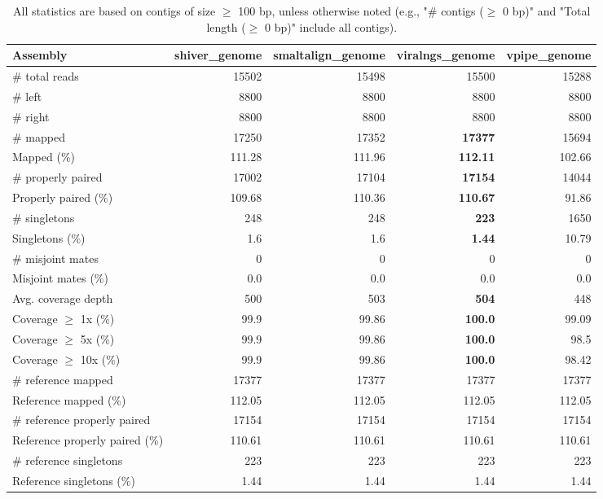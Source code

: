 \documentclass[12pt,a4paper]{article}
\begin{document}
\begin{table}[ht]
\begin{center}
\caption{All statistics are based on contigs of size $\geq$ 100 bp, unless otherwise noted (e.g., "\# contigs ($\geq$ 0 bp)" and "Total length ($\geq$ 0 bp)" include all contigs).}
\begin{tabular}{|l*{4}{|r}|}
\hline
Assembly & shiver\_genome & smaltalign\_genome & viralngs\_genome & vpipe\_genome \\ \hline
\# total reads & 15502 & 15498 & 15500 & 15288 \\ \hline
\# left & 8800 & 8800 & 8800 & 8800 \\ \hline
\# right & 8800 & 8800 & 8800 & 8800 \\ \hline
\# mapped & 17250 & 17352 & {\bf 17377} & 15694 \\ \hline
Mapped (\%) & 111.28 & 111.96 & {\bf 112.11} & 102.66 \\ \hline
\# properly paired & 17002 & 17104 & {\bf 17154} & 14044 \\ \hline
Properly paired (\%) & 109.68 & 110.36 & {\bf 110.67} & 91.86 \\ \hline
\# singletons & 248 & 248 & {\bf 223} & 1650 \\ \hline
Singletons (\%) & 1.6 & 1.6 & {\bf 1.44} & 10.79 \\ \hline
\# misjoint mates & 0 & 0 & 0 & 0 \\ \hline
Misjoint mates (\%) & 0.0 & 0.0 & 0.0 & 0.0 \\ \hline
Avg. coverage depth & 500 & 503 & {\bf 504} & 448 \\ \hline
Coverage $\geq$ 1x (\%) & 99.9 & 99.86 & {\bf 100.0} & 99.09 \\ \hline
Coverage $\geq$ 5x (\%) & 99.9 & 99.86 & {\bf 100.0} & 98.5 \\ \hline
Coverage $\geq$ 10x (\%) & 99.9 & 99.86 & {\bf 100.0} & 98.42 \\ \hline
\# reference mapped & 17377 & 17377 & 17377 & 17377 \\ \hline
Reference mapped (\%) & 112.05 & 112.05 & 112.05 & 112.05 \\ \hline
\# reference properly paired & 17154 & 17154 & 17154 & 17154 \\ \hline
Reference properly paired (\%) & 110.61 & 110.61 & 110.61 & 110.61 \\ \hline
\# reference singletons & 223 & 223 & 223 & 223 \\ \hline
Reference singletons (\%) & 1.44 & 1.44 & 1.44 & 1.44 \\ \hline

\end{tabular}
\end{center}
\end{table}
\end{document}
